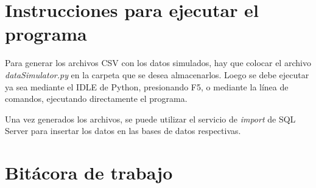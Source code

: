 \documentclass{article}
\begin{document}
\section{Instrucciones para ejecutar el programa}
Para generar los archivos CSV con los datos simulados, hay que colocar el archivo \emph{dataSimulator.py} en la carpeta que se desea almacenarlos. Loego se debe ejecutar ya sea mediante el IDLE de Python, presionando F5, o mediante la l\'inea de comandos, ejecutando directamente el programa.

Una vez generados los archivos, se puede utilizar el servicio de \emph{import} de SQL Server para insertar los datos en las bases de datos respectivas.

\section{Bit\'acora de trabajo}
\end{document}
